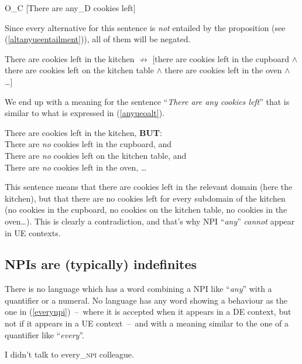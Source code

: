 \documentclass[a4paper,11pt]{article}
\newcommand{\reff}[1]{(\ref{#1})}
\newcommand{\exs}[2][]{\begin{exe}\ex #1 \begin{xlist}#2\end{xlist}\end{exe}}
\begin{document}
\begin{exe}
  \ex\label{anyueo} O_C [There are any_D cookies left]
\end{exe}
%
Since every alternative for this sentence is \emph{not} entailed by the proposition (see \reff{altanyueentailment}), all of them will be negated.

\begin{exe}
	\ex\label{altanyueentailment} There are cookies left in the kitchen $\nrightarrow$ [there are cookies left in the cupboard $\wedge$ there are cookies left on the kitchen table $\wedge$ there are cookies left in the oven $\wedge$ \ldots{}]
\end{exe}
%
We end up with a meaning for the sentence \enquote{\emph{There are any cookies left}} that is similar to what is expressed in \reff{anyueoalt}.

\begin{exe}
	\ex\label{anyueoalt} There are cookies left in the kitchen, \textbf{BUT}:\\
						 There are \emph{no} cookies left in the cupboard, and\\
						 There are \emph{no} cookies left on the kitchen table, and\\
						 There are \emph{no} cookies left in the oven, \ldots{}
\end{exe}
%
This sentence means that there are cookies left in the relevant domain (here the kitchen), but that there are no cookies left for every subdomain of the kitchen (no cookies in the cupboard, no cookies on the kitchen table, no cookies in the oven\ldots{}). This is clearly a contradiction, and that's why NPI \enquote{\emph{any}} \emph{cannot} appear in UE contexts.


\subsection{NPIs are (typically) indefinites}
There is no language which has a word combining a NPI like \enquote{\emph{any}} with a quantifier or a numeral. No language has any word showing a behaviour as the one in \reff{everynpi}~--~where it is accepted when it appears in a DE context, but not if it appears in a UE context~--~and with a meaning similar to the one of a quantifier like \enquote{\emph{every}}.

\exs[\label{everynpi}]{
  \ex{*}{I talked to every_{\textsc{npi}} colleague.}
  \ex I didn't talk to every_{\textsc{npi}} colleague.
}
\end{document}
